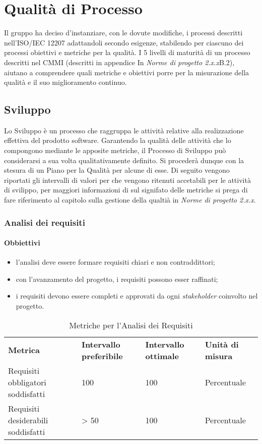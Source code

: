 \section{Qualità di Processo}
Il gruppo ha deciso d'instanziare, con le dovute modifiche, i processi descritti
nell'ISO/IEC 12207 adattandoli secondo esigenze, stabilendo per ciascuno dei processi
obiettivi e metriche per la qualità.
I 5 livelli di maturità di un processo descritti nel CMMI
(descritti in appendice In \textit{Norme di progetto 2.x.x}\doc B.2),
aiutano a comprendere quali metriche e obiettivi porre per la misurazione della
qualità e il suo miglioramento continuo.
\subsection{Sviluppo}
Lo Sviluppo è un processo che raggruppa le attività relative alla realizzazione
effettiva del prodotto software. Garantendo la qualità delle attività che lo
compongono mediante le apposite metriche, il Processo di Sviluppo può
considerarsi a sua volta qualitativamente definito. Si procederà dunque con la
stesura di un Piano per la Qualità per alcune di esse.
Di seguito vengono riportati gli intervalli di valori per che vengono ritenuti
accetabili per le attività di svilippo, per maggiori informazioni di sul signifato
delle metriche si prega di fare riferimento al capitolo sulla gestione della
qualtià in \textit{Norme di progetto 2.x.x}\docs.

\subsubsection{Analisi dei requisiti}
\paragraph{Obbiettivi}
\begin{itemize}
	\item l'analisi deve essere formare requisiti chiari e non contraddittori;
	\item con l'avanzamento del progetto, i requisiti possono esser raffinati;
	\item i requisiti devono essere completi e approvati da ogni \textit{stakeholder\glos} coinvolto nel progetto.
\end{itemize}
\renewcommand{\arraystretch}{2.2}
\begin{longtable}{|C{4.5cm}|C{2.25cm}|C{2.25cm}|C{3cm}|}

	\caption{Metriche per l'Analisi dei Requisiti }\\
	\hline

	\textbf{Metrica} & \textbf{Intervallo preferibile}  & \textbf{Intervallo ottimale} & \textbf{Unità di misura}
	\tabularnewline
	\endfirsthead

	Requisiti obbligatori soddisfatti &  100 & 100 & Percentuale \\
	Requisiti desiderabili soddisfatti &  > 50 & 100 & Percentuale \\
\end{longtable}
\pagebreak


